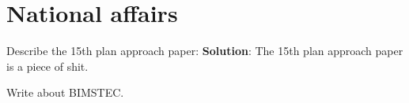 \documentclass[
]{book}
\newcommand{\question}{\item}
\newenvironment{solution}{ {\bfseries Solution}:}{}
\begin{document}
\hypertarget{national-affairs}{%
\section{National affairs}\label{national-affairs}}

\begin{questions}

\question Describe the 15th plan approach paper:
\begin{solution}
The 15th plan approach paper is a piece of shit.
\end{solution}

\question Write about BIMSTEC.

\end{questions}
\end{document}
